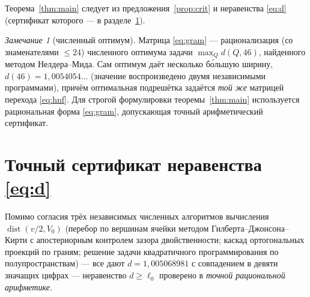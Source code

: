 \documentclass[12pt]{article}
\theoremstyle{definition}
\theoremstyle{remark}
\newtheorem{remark}{Замечание}
\newcommand{\dist}{\operatorname{dist}}
\begin{document}
Теорема~\ref{thm:main} следует из предложения~\ref{prop:crit} и неравенства
\eqref{eq:d} (сертификат которого --- в разделе~\ref{sec:comp}).

\begin{remark}[численный оптимум]\label{rem:float}
Матрица \eqref{eq:gram} --- рационализация (со знаменателями $\le24$)
численного оптимума задачи $\max_Q d(Q,46)$, найденного методом Нелдера--Мида.
Сам оптимум даёт несколько бо́льшую ширину, $d(46)=1{,}0054054\ldots$ (значение
воспроизведено двумя независимыми программами), причём оптимальная подрешётка
задаётся \emph{той же} матрицей перехода \eqref{eq:hnf}. Для строгой
формулировки теоремы~\ref{thm:main} используется рациональная форма
\eqref{eq:gram}, допускающая точный арифметический сертификат.
\end{remark}

\section{Точный сертификат неравенства \eqref{eq:d}}\label{sec:comp}

Помимо согласия трёх независимых численных алгоритмов вычисления
$\dist(v/2,V_0)$ (перебор по вершинам ячейки методом Гилберта--Джонсона--Кирти
с апостериорным контролем зазора двойственности; каскад ортогональных проекций
по граням; решение задачи квадратичного программирования по полупространствам)
--- все дают $d=1{,}005068981$ с совпадением в девяти значащих цифрах ---
неравенство $d\ge\ell_0$ проверено в \emph{точной рациональной арифметике}.
\end{document}
